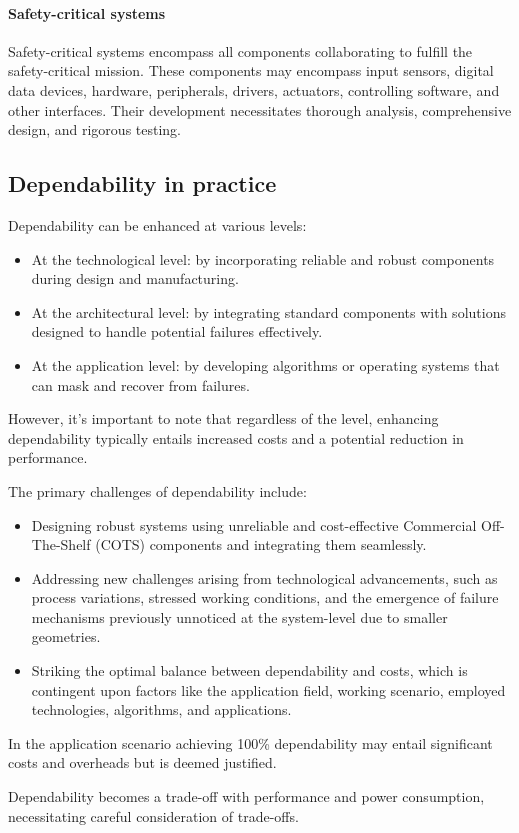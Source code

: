 \paragraph*{Safety-critical systems}
Safety-critical systems encompass all components collaborating to fulfill the safety-critical mission. 
These components may encompass input sensors, digital data devices, hardware, peripherals, drivers, actuators, controlling software, and other interfaces.
Their development necessitates thorough analysis, comprehensive design, and rigorous testing.

\subsection{Dependability in practice}
Dependability can be enhanced at various levels:
\begin{itemize}
    \item At the technological level: by incorporating reliable and robust components during design and manufacturing.
    \item At the architectural level: by integrating standard components with solutions designed to handle potential failures effectively.
    \item At the application level: by developing algorithms or operating systems that can mask and recover from failures.
\end{itemize}
However, it's important to note that regardless of the level, enhancing dependability typically entails increased costs and a potential reduction in performance.

The primary challenges of dependability include:
\begin{itemize}
    \item Designing robust systems using unreliable and cost-effective Commercial Off-The-Shelf (COTS) components and integrating them seamlessly.
    \item Addressing new challenges arising from technological advancements, such as process variations, stressed working conditions, and the emergence of failure mechanisms previously unnoticed at the system-level due to smaller geometries.
    \item Striking the optimal balance between dependability and costs, which is contingent upon factors like the application field, working scenario, employed technologies, algorithms, and applications.
\end{itemize}
In the application scenario achieving 100\% dependability may entail significant costs and overheads but is deemed justified.

Dependability becomes a trade-off with performance and power consumption, necessitating careful consideration of trade-offs.